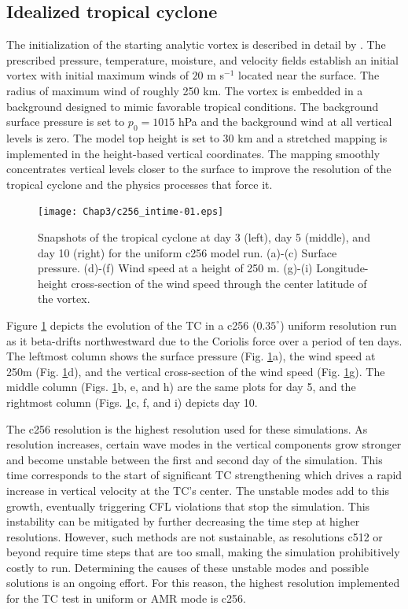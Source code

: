\subsection{Idealized tropical cyclone}
  The initialization of the starting analytic vortex is
  described in detail by \cite{reed2011vortex}. The prescribed
  pressure, temperature, moisture, and velocity fields establish
  an initial vortex with initial maximum winds of $20$ m s$^{-1}$ located
  near the surface. The radius of maximum wind of roughly 250 km. The
  vortex is embedded in a background designed to
  mimic favorable tropical conditions.
  The background surface pressure is set to $p_0 = 1015$ hPa
  and the background wind at all vertical levels is zero.
  The model top height is set to 30 km and a stretched mapping is implemented
  in the height-based vertical coordinates.
  The mapping smoothly
  concentrates vertical levels closer to the surface to improve the resolution
  of the tropical cyclone and the physics processes that force it.

\begin{figure}
    \centerline{%
    \noindent
    \texttt{[image: Chap3/c256\_intime-01.eps]}}
    \caption{Snapshots of the tropical cyclone at day 3 (left), day 5 (middle), and day 10 (right)
    for the uniform c256 model run. (a)-(c) Surface pressure. (d)-(f) Wind speed at
    a height of 250 m. (g)-(i) Longitude-height cross-section of the wind speed through the center
    latitude of the vortex.
}%
    \label{fig:c256intime}
\end{figure}

   Figure \ref{fig:c256intime} depicts the evolution of the TC in 
   a c256 ($0.35^\circ$) uniform resolution run as it beta-drifts
   northwestward due to the Coriolis force over a period of ten days. The leftmost column shows 
   the surface pressure (Fig. \ref{fig:c256intime}a),
   the wind speed at 250m (Fig. \ref{fig:c256intime}d), and the vertical cross-section 
   of the wind speed (Fig. \ref{fig:c256intime}g). The middle column (Figs. \ref{fig:c256intime}b, e, and h)
   are the same plots for day 5, and the rightmost column (Figs. \ref{fig:c256intime}c, f, and i)
   depicts day 10.
   
   The c256 resolution is the highest resolution used for these simulations. As resolution
   increases, certain wave modes in the vertical components grow stronger and become unstable between
   the first and second day of the simulation. This time corresponds to the start of significant TC strengthening 
   which drives a rapid increase in vertical velocity at the TC's center. 
   The unstable modes add to this growth, eventually triggering CFL violations that stop the simulation.
   This instability can be mitigated by further decreasing the time step at higher resolutions. 
   However, such methods are not sustainable, as resolutions c512 or beyond require 
   time steps that are too small, making the simulation prohibitively costly to run. 
   Determining the causes of these unstable modes and possible solutions is an
   ongoing effort. For this reason, the highest resolution implemented for the TC test in uniform 
   or AMR mode is c256.


